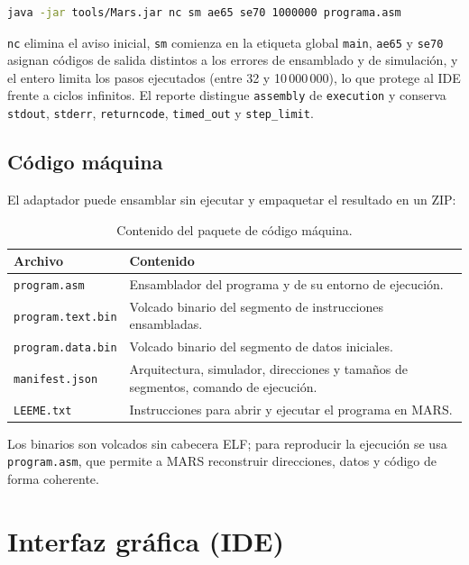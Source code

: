 \documentclass[11pt,a4paper]{article}
\begin{document}
\begin{lstlisting}[language=bash,caption={Comando de referencia de MARS.}]
java -jar tools/Mars.jar nc sm ae65 se70 1000000 programa.asm
\end{lstlisting}

\texttt{nc} elimina el aviso inicial, \texttt{sm} comienza en la etiqueta global
\texttt{main}, \texttt{ae65} y \texttt{se70} asignan códigos de salida distintos
a los errores de ensamblado y de simulación, y el entero limita los pasos
ejecutados (entre 32 y 10\,000\,000), lo que protege al IDE frente a ciclos
infinitos. El reporte distingue \texttt{assembly} de \texttt{execution} y
conserva \texttt{stdout}, \texttt{stderr}, \texttt{returncode},
\texttt{timed\_out} y \texttt{step\_limit}.

\subsection{Código máquina}

El adaptador puede ensamblar sin ejecutar y empaquetar el resultado en un ZIP:

\begin{table}[H]
\centering
\small
\begin{tabular}{@{}L{4.0cm}L{10.2cm}@{}}
\toprule
\textbf{Archivo} & \textbf{Contenido} \\
\midrule
\texttt{program.asm} & Ensamblador del programa y de su entorno de ejecución. \\
\texttt{program.text.bin} & Volcado binario del segmento de instrucciones
ensambladas. \\
\texttt{program.data.bin} & Volcado binario del segmento de datos iniciales. \\
\texttt{manifest.json} & Arquitectura, simulador, direcciones y tamaños de
segmentos, comando de ejecución. \\
\texttt{LEEME.txt} & Instrucciones para abrir y ejecutar el programa en MARS. \\
\bottomrule
\end{tabular}
\caption{Contenido del paquete de código máquina.}
\end{table}

Los binarios son volcados sin cabecera ELF; para reproducir la ejecución se usa
\texttt{program.asm}, que permite a MARS reconstruir direcciones, datos y
código de forma coherente.

\section{Interfaz gráfica (IDE)}
\end{document}
